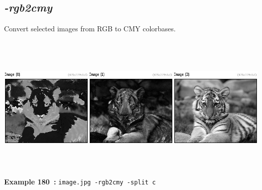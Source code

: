 \documentclass[a4paper,11pt,twoside]{book}
\begin{document}
\subsection{\emph{-rgb2cmy} }\vspace*{-0.5em}
Convert selected images from RGB to CMY colorbases.
\begin{center}\includegraphics[keepaspectratio=true,height=7cm,width=\textwidth]{img/gmic_def180.jpg}\\
{\footnotesize \textbf{Example 180~:} \texttt{image.jpg -rgb2cmy -split c}}
\end{center}
\end{document}
